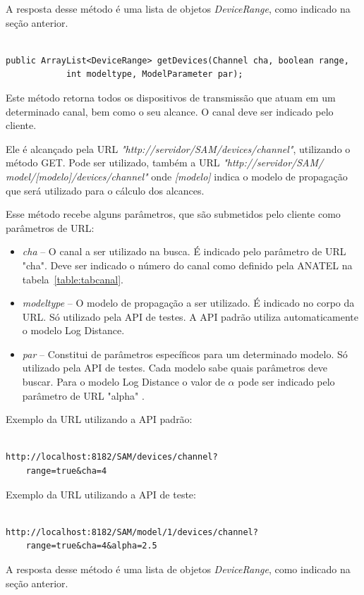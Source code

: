 A resposta desse método é uma lista de objetos \textit{DeviceRange}, como indicado na seção anterior.


\begin{lstlisting}	

public ArrayList<DeviceRange> getDevices(Channel cha, boolean range, 
			int modeltype, ModelParameter par);

\end{lstlisting}

Este método retorna todos os dispositivos de transmissão que atuam em um determinado canal, bem como o seu alcance. O canal deve ser indicado pelo cliente.

Ele é alcançado pela URL \textit{"http://servidor/SAM/devices/channel"}, utilizando o método GET. Pode ser utilizado, também a URL \textit{"http://servidor/SAM/ model/[modelo]/devices/channel"} onde \textit{[modelo]} indica o modelo de propagação que será utilizado para o cálculo dos alcances.

Esse método recebe alguns parâmetros, que são submetidos pelo cliente como parâmetros de URL:

\begin{itemize}
\item \textit{cha} --  O canal a ser utilizado na busca. É indicado pelo parâmetro de URL "cha". Deve ser indicado o número do canal como definido pela ANATEL na tabela~\ref{table:tabcanal}.
\item \textit{modeltype} -- O modelo de propagação a ser utilizado. É indicado no corpo da URL. Só utilizado pela API de testes. A API padrão utiliza automaticamente o modelo Log Distance.
\item \textit{par} -- Constitui de parâmetros específicos para um determinado modelo. Só utilizado pela API de testes. Cada modelo sabe quais parâmetros deve buscar. Para o modelo Log Distance o valor de \begin{math} \alpha \end{math} pode ser indicado pelo parâmetro de URL "alpha" .
\end{itemize}

Exemplo da URL utilizando a API padrão:

\begin{lstlisting}	

http://localhost:8182/SAM/devices/channel?
	range=true&cha=4

\end{lstlisting}

Exemplo da URL utilizando a API de teste:

\begin{lstlisting}			

http://localhost:8182/SAM/model/1/devices/channel?
	range=true&cha=4&alpha=2.5

\end{lstlisting}

A resposta desse método é uma lista de objetos \textit{DeviceRange}, como indicado na seção anterior.
